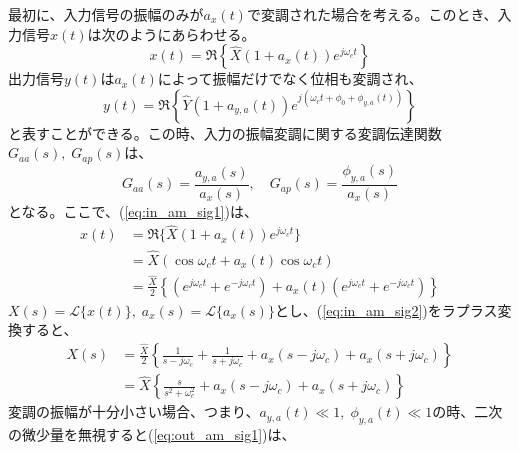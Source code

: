 \documentclass[book]{jlreq}
\begin{document}
最初に、入力信号の振幅のみが$a_x(t)$で変調された場合を考える。このとき、入力信号$x(t)$は次のようにあらわせる。
%
\begin{equation}
    x(t) = \Re\left \{\hat{X}(1 + a_x(t))e^{j\omega_c t}\right \}
    \label{eq:in_am_sig1}
\end{equation}
%
出力信号$y(t)$は$a_x(t)$によって振幅だけでなく位相も変調され、
%
\begin{equation}
    y(t) = \Re\left \{\hat{Y}(1 + a_{y,a}(t))e^{j(\omega_c t + \phi_0 + \phi_{y,a} (t))}\right \}
    \label{eq:out_am_sig1}
\end{equation}
%
と表すことができる。この時、入力の振幅変調に関する変調伝達関数$G_{aa}(s),\;G_{ap}(s)$は、
%
\begin{equation}
    G_{aa}(s) =  \frac{a_{y, a}(s)}{a_x(s)}, \quad G_{ap}(s) =  \frac{\phi_{y, a}(s)}{a_x(s)}
 \label{eq:am_tf}
\end{equation}
%
となる。ここで、(\ref{eq:in_am_sig1})は、
%
\begin{equation}
    \begin{split}
        x(t) &= \Re\{\hat{X}(1 + a_x(t))e^{j\omega_c t}\} \\
            &= \hat{X}(\cos\omega_c t + a_x(t) \cos\omega_c t) \\
            &=  \frac{\hat{X}}{2}\left \{(e^{j\omega_c t}+e^{-j\omega_c t})+a_x(t)(e^{j\omega_c t} + e^{-j\omega_c t}) \right \}
            \label{eq:in_am_sig2}
    \end{split}
\end{equation}
%
$X(s)=\mathcal{L}\{x(t)\},\; a_x(s) = \mathcal{L}\{a_x(s)\}$とし、(\ref{eq:in_am_sig2})をラプラス変換すると、
%
\begin{equation}
    \begin{split}
        X(s) &= \frac{\hat{X}}{2}\left \{\frac{1}{s-j\omega_c} 
        + \frac{1}{s+j\omega_c} + a_x(s - j\omega_c)+a_x(s+j\omega_c) \right \} \\
            &= \hat{X}\left \{\frac{s}{s^2 + \omega_c^2} 
            + a_x(s - j\omega_c)+a_x(s+j\omega_c) \right \}
    \end{split}
    \label{eq:lt_in_sig2}
\end{equation}
%
変調の振幅が十分小さい場合、つまり、$a_{y, a}(t) \ll 1,\; \phi_{y, a}(t) \ll 1$の時、二次の微少量を無視すると(\ref{eq:out_am_sig1})は、
%
\end{document}
